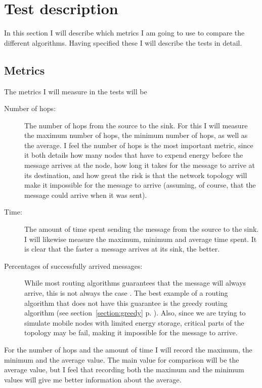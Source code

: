 \section{Test description}
\label{section:test_description}

In this section I will describe which metrics I am going to use to compare the different algorithms. Having specified these I will describe the tests in detail.

\subsection{Metrics}

The metrics I will measure in the tests will be 
\begin{description}
\item[Number of hops:] The number of hops from the source to the sink. For this I will measure the maximum number of hops, the minimum number of hops, as well as the average. I feel the number of hops is the most important metric, since it both details how many nodes that have to expend energy before the message arrives at the node, how long it takes for the message to arrive at its destination, and how great the risk is that the network topology will make it impossible for the message to arrive (assuming, of course, that the message could arrive when it was sent).

\item[Time:] The amount of time spent sending the message from the source to the sink. I will likewise measure the maximum, minimum and average time spent. It is clear that the faster a message arrives at its sink, the better.

\item[Percentages of successfully arrived messages:] While most routing algorithms guarantees that the message will always arrive, this is not always the case . The best example of a routing algorithm that does not have this guarantee is the greedy routing algorithm (see section~\ref{section:greedy} p. \pageref{section:greedy}). Also, since we are trying to simulate mobile nodes with limited energy storage, critical parts of the topology may be fail, making it impossible for the message to arrive.
\end{description}

For the number of hops and the  amount of time I will record the maximum, the minimum and the average value. The main value for comparison will be the average value, but I feel that recording both the maximum and the minimum values will give me better information about the average.

